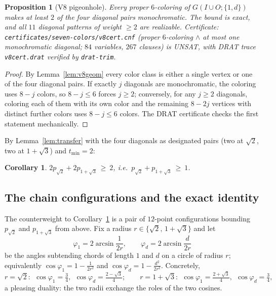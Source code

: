 \documentclass[11pt]{article}
\newtheorem{proposition}[theorem]{Proposition}
\newtheorem{corollary}[theorem]{Corollary}
\theoremstyle{definition}
\theoremstyle{remark}
\newcommand{\dd}{d}                          %
\begin{document}
\begin{proposition}[V8 pigeonhole]\label{prop:v8}
Every proper $6$-coloring of $G(I\cup O;\{1,\dd\})$ makes at least $2$ of
the four diagonal pairs monochromatic.  The bound is exact, and all $11$
diagonal patterns of weight $\ge2$ are realizable.  Certificate:
\texttt{certificates/seven-colors/v8cert.cnf} (proper $6$-coloring
$\wedge$ at most one monochromatic diagonal; $84$ variables, $267$
clauses) is UNSAT, with DRAT trace \texttt{v8cert.drat} verified by
\texttt{drat-trim}.
\end{proposition}

\begin{proof}
By Lemma~\ref{lem:v8geom} every color class is either a single vertex or
one of the four diagonal pairs.  If exactly $j$ diagonals are
monochromatic, the coloring uses $8-j$ colors, so $8-j\le6$ forces
$j\ge2$; conversely, for any $j\ge2$ diagonals, coloring each of them
with its own color and the remaining $8-2j$ vertices with distinct
further colors uses $8-j\le6$ colors.  The DRAT certificate checks the
first statement mechanically.
\end{proof}

By Lemma~\ref{lem:transfer} with the four diagonals as
designated pairs (two at $\sqrt2$, two at $1+\sqrt3$) and $t_{\min}=2$:

\begin{corollary}\label{cor:v8}
$2p_{\sqrt2}+2p_{1+\sqrt3}\ \ge\ 2$, i.e.\
$p_{\sqrt2}+p_{1+\sqrt3}\ \ge\ 1$.
\end{corollary}

\subsection{The chain configurations and the exact identity}\label{sec:chains}

The counterweight to Corollary~\ref{cor:v8} is a pair of $12$-point
configurations bounding $p_{\sqrt2}$ and $p_{1+\sqrt3}$ from above.
Fix a radius $r\in\{\sqrt2,\,1+\sqrt3\}$ and let
\[
  \varphi_1=2\arcsin\frac{1}{2r},\qquad
  \varphi_{\dd}=2\arcsin\frac{\dd}{2r}
\]
be the angles subtending chords of length $1$ and $\dd$ on a circle of
radius $r$; equivalently $\cos\varphi_1=1-\tfrac1{2r^2}$ and
$\cos\varphi_{\dd}=1-\tfrac{\dd^2}{2r^2}$.  Concretely,
\[
  r=\sqrt2:\ \ \cos\varphi_1=\tfrac34,\ \
  \cos\varphi_{\dd}=\tfrac{2-\sqrt3}{4};
  \qquad
  r=1+\sqrt3:\ \ \cos\varphi_1=\tfrac{2+\sqrt3}{4},\ \
  \cos\varphi_{\dd}=\tfrac34,
\]
a pleasing duality: the two radii exchange the roles of the two cosines.
\end{document}
